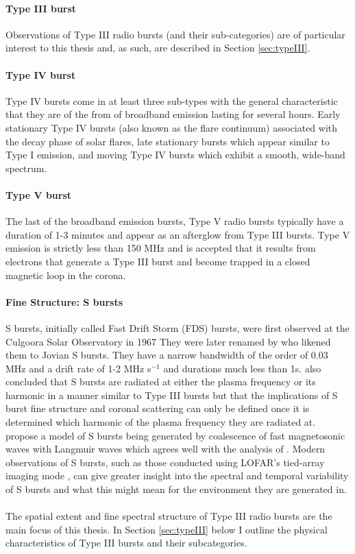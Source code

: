 \paragraph{Type III burst}
Observations of Type III radio bursts (and their sub-categories) are of particular interest to this thesis and, as such, are described in Section \ref{sec:typeIII}.
\paragraph{Type IV burst}
Type IV bursts come in at least three sub-types with the general characteristic that they are of the from of broadband emission lasting for several hours. Early stationary Type IV bursts (also known as the flare continuum) associated with the decay phase of solar flares, late stationary bursts which appear similar to Type I emission, and moving Type IV bursts which exhibit a smooth, wide-band spectrum.
\paragraph{Type V burst}
The last of the broadband emission bursts, Type V radio bursts typically have a duration of 1-3 minutes and appear as an afterglow from Type III bursts. Type V emission is strictly less than 150 MHz and is accepted that it results from electrons that generate a Type III burst and become trapped in a closed magnetic loop in the corona.

\paragraph{Fine Structure: S bursts} 
S bursts, initially called Fast Drift Storm (FDS) bursts, were first observed at the Culgoora Solar Observatory in 1967 \citep{Ellis1969} They were later renamed by \cite{McConnell1980} who likened them to Jovian S bursts. They have a narrow bandwidth of the order of 0.03 MHz and a drift rate of 1-2 MHz s$^{-1}$ and durations much less than 1s. \cite{McConnell1980} also concluded that S bursts are radiated at either the plasma frequency or its harmonic in a manner similar to Type III bursts but that the implications of S burst fine structure and coronal scattering can only be defined once it is determined which harmonic of the plasma frequency they are radiated at. \cite{Melnik2010} propose a model of S bursts being generated by coalescence of fast magnetosonic waves with Langmuir waves which agrees well with the analysis of \cite{Clarke2019}. Modern observations of S bursts, such as those conducted using LOFAR's tied-array imaging mode \citep{Morosan2015}, can give greater insight into the spectral and temporal variability of S bursts and what this might mean for the environment they are generated in.
\\
\\The spatial extent and fine spectral structure of Type III radio bursts are the main focus of this thesis. In Section \ref{sec:typeIII} below I outline the physical characteristics of Type III bursts and their subcategories.

